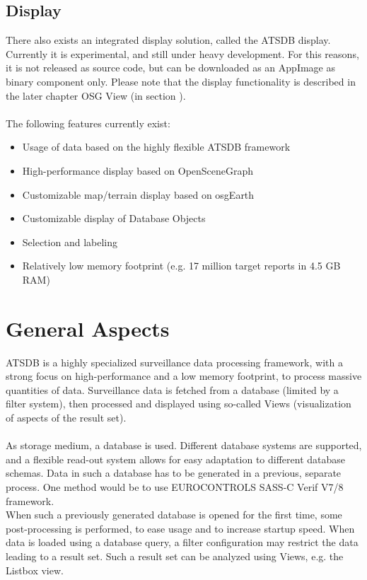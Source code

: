 \subsection{Display}
There also exists an integrated display solution, called the ATSDB display. Currently it is experimental, and still under heavy development. For this reasons, it is not released as source code, but can be downloaded as an AppImage as binary component only. Please note that the display functionality is described in the later chapter OSG View (in section ).\\\\

The following features currently exist:

\begin{itemize}  
\item Usage of data based on the highly flexible ATSDB framework
\item High-performance display based on OpenSceneGraph
\item Customizable map/terrain display based on osgEarth
\item Customizable display of Database Objects
\item Selection and labeling
\item Relatively low memory footprint (e.g. 17 million target reports in 4.5 GB RAM)
\end{itemize}

\section{General Aspects}
ATSDB is a highly specialized surveillance data processing framework, with a strong focus on high-performance and  a  low  memory  footprint,  to  process  massive  quantities  of  data.   Surveillance  data  is fetched from a database (limited by a filter system), then processed and displayed using so-called Views (visualization of aspects of the result set).\\\\

As storage medium, a database is used.  Different database systems are supported, and a flexible read-out system allows for easy adaptation to different database schemas.  Data in such a database has to be generated in a previous, separate process.  One method would be to use EUROCONTROLS SASS-C  Verif V7/8 framework.\\

When such a previously generated database is opened for the first time, some post-processing is performed, to ease usage and to increase startup speed.  When data is loaded using a database query, a filter configuration may restrict the data leading to a result set.  Such a result set can be analyzed using Views, e.g. the Listbox view.\\

